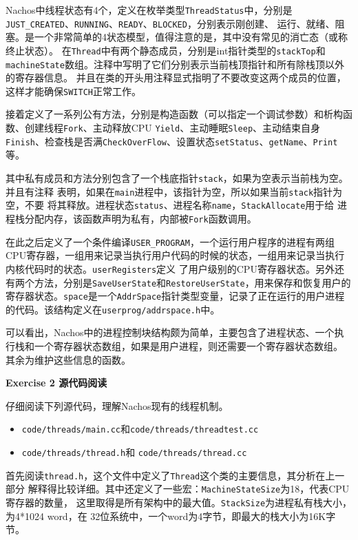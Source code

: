 Nachos中线程状态有4个，定义在枚举类型\texttt{ThreadStatus}中，分别是\texttt{JUST\_CREATED}、\texttt{RUNNING}、\texttt{READY}、\texttt{BLOCKED}，分别表示刚创建、
运行、就绪、阻塞。是一个非常简单的4状态模型，值得注意的是，其中没有常见的消亡态（或称终止状态）。
在\texttt{Thread}中有两个静态成员，分别是int指针类型的\texttt{stackTop}和\texttt{machineState}数组。注释中写明了它们分别表示当前栈顶指针和所有除栈顶以外的寄存器信息。
并且在类的开头用注释显式指明了不要改变这两个成员的位置，这样才能确保\texttt{SWITCH}正常工作。

接着定义了一系列公有方法，分别是构造函数（可以指定一个调试参数）和析构函数、创建线程\texttt{Fork}、主动释放CPU \texttt{Yield}、主动睡眠\texttt{Sleep}、主动结束自身\texttt{Finish}、检查栈是否满\texttt{CheckOverFlow}、设置状态\texttt{setStatus}、\texttt{getName}、\texttt{Print}等。

其中私有成员和方法分别包含了一个栈底指针\texttt{stack}，如果为空表示当前栈为空。并且有注释
表明，如果在\texttt{main}进程中，该指针为空，所以如果当前\texttt{stack}指针为空，不要
将其释放。进程状态\texttt{status}、进程名称\texttt{name}，\texttt{StackAllocate}用于给
进程栈分配内存，该函数声明为私有，内部被\texttt{Fork}函数调用。

在此之后定义了一个条件编译\texttt{USER\_PROGRAM}，一个运行用户程序的进程有两组CPU寄存器，一组用来记录当执行用户代码的时候的状态，一组用来记录当执行内核代码时的状态。\texttt{userRegisters}定义
了用户级别的CPU寄存器状态。另外还有两个方法，分别是\texttt{SaveUserState}和\texttt{RestoreUserState}，用来保存和恢复用户的寄存器状态。\texttt{space}是一个\texttt{AddrSpace}指针类型变量，记录了正在运行的用户进程的代码。该结构定义在\texttt{userprog/addrspace.h}中。

可以看出，Nachos中的进程控制块结构颇为简单，主要包含了进程状态、一个执行栈和一个寄存器状态数组，如果是用户进程，则还需要一个寄存器状态数组。
其余为维护这些信息的函数。

\textbf{Exercise 2 源代码阅读}

仔细阅读下列源代码，理解Nachos现有的线程机制。
\begin{itemize}
    \item \texttt{code/threads/main.cc}和\texttt{code/threads/threadtest.cc}
    \item \texttt{code/threads/thread.h}和 \texttt{code/threads/thread.cc}
\end{itemize}

首先阅读\texttt{thread.h}，这个文件中定义了\texttt{Thread}这个类的主要信息，其分析在上一部分
解释得比较详细。其中还定义了一些宏：\texttt{MachineStateSize}为18，代表CPU寄存器的数量，
这里取得是所有架构中的最大值。\texttt{StackSize}为进程私有栈大小，为4*1024 word，在
32位系统中，一个word为4字节，即最大的栈大小为16K字节。

